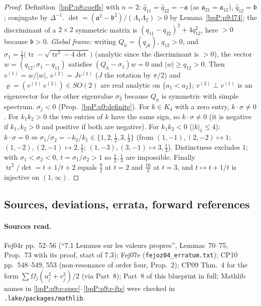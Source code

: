\begin{proof}
\label{stepP:p9:n2-mat} Definition~\ref{bpP:p8:coeffs} with $n=2$: $\hat q_{11}=\hat q_{22}=-\mathfrak a$ (as $\mathfrak a_{21}=\mathfrak a_{12}$), $\hat q_{12}=\mathfrak b$; conjugate by $\Delta^{-1}$. $\det=(\mathfrak a^2-\mathfrak b^2)/(\Lambda_1\Lambda_2)>0$ by Lemma~\ref{bpP:p9:l74}; the discriminant of a $2\times2$ symmetric matrix is $(q_{11}-q_{22})^2+4q_{12}^2$, here $>0$ because $\mathfrak b>0$. \emph{Global frame:} writing $Q_h=(q_{jk})$, $q_{12}>0$, and $\sigma_1=\tfrac12\big(\operatorname{tr}-\sqrt{\operatorname{tr}^2-4\det}\big)$ (analytic since the discriminant is $>0$), the vector $w=(q_{12},\sigma_1-q_{11})$ satisfies $(Q_h-\sigma_1)w=0$ and $\lvert w\rvert\ge q_{12}>0$. Then $v^{(1)}=w/\lvert w\rvert$, $v^{(2)}=Jv^{(1)}$ ($J$ the rotation by $\pi/2$) and $\varrho=(v^{(1)}\,v^{(2)})\in SO(2)$ are real analytic on $\{a_1<a_2\}$; $v^{(2)}\perp v^{(1)}$ is an eigenvector for the other eigenvalue $\sigma_2$ because $Q_h$ is symmetric with simple spectrum.
\label{stepP:p9:n2-res} $\sigma_j<0$ (Prop.~\ref{bpP:p9:definite}). For $k\in K_4$ with a zero entry, $k\cdot\sigma\ne0$. For $k_1k_2>0$ the two entries of $k$ have the same sign, so $k\cdot\sigma\ne0$ (it is negative if $k_1,k_2>0$ and positive if both are negative). For $k_1k_2<0$ ($\lvert k\rvert_1\le4$): $k\cdot\sigma=0\iff\sigma_1/\sigma_2=-k_2/k_1\in\{1,2,\tfrac12,3,\tfrac13\}$ (from $(1,-1),(2,-2)\mapsto1$; $(1,-2),(2,-1)\mapsto2,\tfrac12$; $(1,-3),(3,-1)\mapsto3,\tfrac13$). Distinctness excludes $1$; with $\sigma_1<\sigma_2<0$, $t=\sigma_1/\sigma_2>1$ so $\tfrac12,\tfrac13$ are impossible. Finally $\operatorname{tr}^2/\det=t+1/t+2$ equals $\tfrac92$ at $t=2$ and $\tfrac{16}3$ at $t=3$, and $t\mapsto t+1/t$ is injective on $(1,\infty)$.
\end{proof}

\subsection{Sources, deviations, errata, forward references}\label{bpP:p9:notes}

\paragraph{Sources read.} Fej04r pp.~52--56 (``7.1 Lemmes sur les valeurs propres'', Lemmas~70--75, Prop.~73 with its proof, start of 7.3); Fej07e (\texttt{fejoz04\_erratum.txt}); CP10 pp.~548--549, 553 (non-resonance of order four, Prop.~2); CP09 Thm.~4 for the form $\sum\Omega_j(u_j^2+v_j^2)/2$ (via Part~8); Part~8 of this blueprint in full; Mathlib names in \ref{bpP:p9:e-spec}--\ref{bpP:p9:e-fts} were checked in \texttt{.lake/packages/mathlib}.

